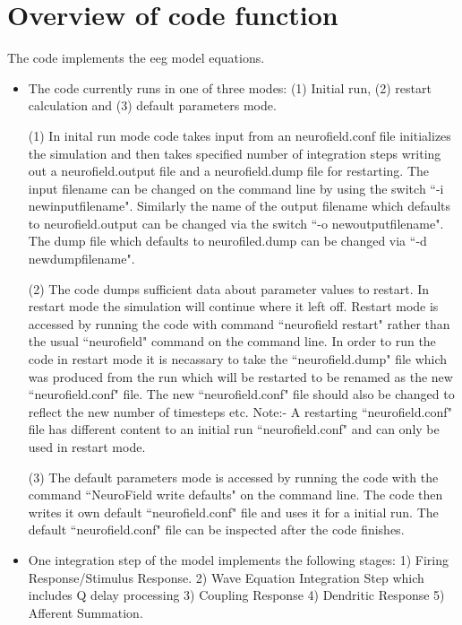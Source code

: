 \documentclass[12pt,a4paper]{article}
\begin{document}
\section{Overview of code function}

The code implements the eeg model equations.

\begin{itemize}

\item The code currently runs in one of three modes: (1) Initial run,
(2) restart calculation and (3) default parameters mode.

(1) In inital run mode
code takes input from an neurofield.conf file
initializes the simulation and then takes specified number of integration steps
writing out a neurofield.output file and a neurofield.dump file for restarting.
The input filename can be changed on the command line by using the switch
``-i newinputfilename". Similarly the name of the output filename which defaults
to neurofield.output can be changed via the switch ``-o newoutputfilename". The
dump file which defaults to neurofiled.dump can be changed via ``-d newdumpfilename".

(2) The code dumps sufficient data about parameter values to restart. In
restart mode the simulation will continue where it left off. Restart mode is
accessed by running the code with command ``neurofield restart" rather than
the usual ``neurofield" command on the command line. In order to run the code in restart
mode it is necassary to take the ``neurofield.dump" file which was produced from
the run which will be restarted to be renamed as the
new ``neurofield.conf" file. The new ``neurofield.conf"
file should also be changed to reflect the new number of timesteps etc.
Note:- A restarting ``neurofield.conf" file has different content to an initial run
``neurofield.conf" and can only be used in restart mode.

(3) The default parameters
mode is accessed by running the code with the command ``NeuroField write defaults"
on the command line. The code then writes it own default ``neurofield.conf" file
and uses it for a initial run. The default ``neurofield.conf" file can be 
inspected after the code finishes.

\item One integration step of the model implements the following stages:
1) Firing Response/Stimulus Response. 2) Wave Equation Integration Step
which includes Q delay processing 3) Coupling Response 4) Dendritic Response
5) Afferent Summation.


\end{itemize}
\end{document}
